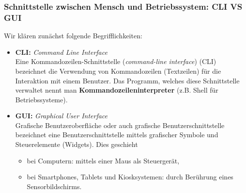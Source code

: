 




\subsubsection{Schnittstelle zwischen Mensch und Betriebssystem: CLI VS GUI}
Wir klären zunächst folgende Begrifflichkeiten:
\begin{itemize}
	\item \textbf{CLI:} \textit{Command Line Interface} \\
Eine Kommandozeilen-Schnittstelle (\textit{command-line interface}) (CLI)  bezeichnet die Verwendung von Kommandozeilen (Textzeilen) für die Interaktion mit einem Benutzer. Das Programm, welches diese Schnittstelle verwaltet nennt man \textbf{Kommandozeileninterpreter} (z.B. Shell für Betriebssysteme).
%
\item \textbf{GUI:} \textit{Graphical User Interface}\\
Grafische Benutzeroberfläche oder auch grafische Benutzerschnittstelle bezeichnet eine Benutzerschnittstelle mittels grafischer Symbole und Steuerelemente (Widgets). Dies geschieht 
\begin{itemize}
	\item bei Computern: mittels einer Maus als Steuergerät,
	\item bei Smartphones, Tablets und Kiosksystemen:  durch Berührung eines Sensorbildschirms. 
\end{itemize}
\end{itemize}

